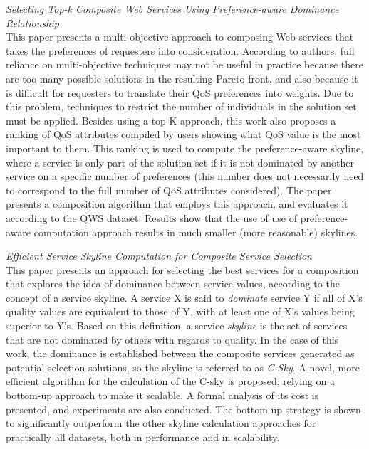 \textit{Selecting Top-k Composite Web Services Using Preference-aware Dominance Relationship \cite{zhang2013selecting}}\\
This paper presents a multi-objective approach to composing Web services that takes the preferences of requesters into consideration.
According to authors, full reliance on multi-objective techniques may not be useful in practice because there are too many possible
solutions in the resulting Pareto front, and also because it is difficult for requesters to translate their QoS preferences into weights.
Due to this problem, techniques to restrict the number of individuals in the solution set must be applied. Besides using a top-K approach,
this work also proposes a ranking of QoS attributes compiled by users showing what QoS value is the most important to them. This ranking
is used to compute the preference-aware skyline, where a service is only part of the solution set if it is not dominated by another service
on a specific number of preferences (this number does not necessarily need to correspond to the full number of QoS attributes considered).
The paper presents a composition algorithm that employs this approach, and evaluates it according to the QWS dataset. Results show that the use
of use of preference-aware computation approach results in much smaller (more reasonable) skylines.

\textit{Efficient Service Skyline Computation for Composite Service Selection \cite{yu2013efficient}}\\
This paper presents an approach for selecting the best services for a composition that explores the idea of dominance between service values, according to the
concept of a service skyline. A service X is said to \textit{dominate} service Y if all of X's quality values are equivalent to those of Y, with at
least one of X's values being superior to Y's. Based on this definition, a service \textit{skyline} is the set of services that are not dominated by others
with regards to quality. In the case of this work, the dominance is established between the composite services generated as potential selection solutions, so
the skyline is referred to as \textit{C-Sky}. A novel, more efficient algorithm for the calculation of the C-sky is proposed, relying on a bottom-up approach
to make it scalable. A formal analysis of its cost is presented, and experiments are also conducted. The bottom-up strategy is shown to significantly outperform
the other skyline calculation approaches for practically all datasets, both in performance and in scalability.

